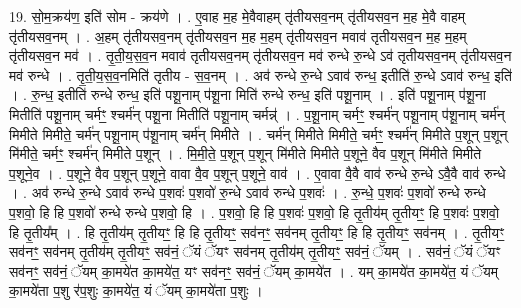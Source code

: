 \documentclass[17pt]{extarticle}
\begin{document}
19. सो॒म॒क्रय॑ण॒ इति॑ सोम - क्रय॑णे । . ए॒वाह म॒ह मे॒वैवाहम् तृ॑तीयसव॒नम् तृ॑तीयसव॒न म॒ह मे॒वै वाहम् तृ॑तीयसव॒नम् । . अ॒हम् तृ॑तीयसव॒नम् तृ॑तीयसव॒न म॒ह म॒हम् तृ॑तीयसव॒न मवाव॑ तृतीयसव॒न म॒ह म॒हम् तृ॑तीयसव॒न मव॑ । . तृ॒ती॒य॒स॒व॒न मवाव॑ तृतीयसव॒नम् तृ॑तीयसव॒न मव॑ रुन्धे रु॒न्धे ऽव॑ तृतीयसव॒नम् तृ॑तीयसव॒न मव॑ रुन्धे । . तृ॒ती॒य॒स॒व॒नमिति॑ तृतीय - स॒व॒नम् । . अव॑ रुन्धे रु॒न्धे ऽवाव॑ रुन्ध॒ इतीति॑ रु॒न्धे ऽवाव॑ रुन्ध॒ इति॑ । . रु॒न्ध॒ इतीति॑ रुन्धे रुन्ध॒ इति॑ पशू॒नाम् प॑शू॒ना मिति॑ रुन्धे रुन्ध॒ इति॑ पशू॒नाम् । . इति॑ पशू॒नाम् प॑शू॒ना मितीति॑ पशू॒नाम् चर्मꣳ॒॒ श्चर्म॑न् पशू॒ना मितीति॑ पशू॒नाम् चर्मन्न्॑ । . प॒शू॒नाम् चर्मꣳ॒॒ श्चर्म॑न् पशू॒नाम् प॑शू॒नाम् चर्म॑न् मिमीते मिमीते॒ चर्म॑न् पशू॒नाम् प॑शू॒नाम् चर्म॑न् मिमीते । . चर्म॑न् मिमीते मिमीते॒ चर्मꣳ॒॒ श्चर्म॑न् मिमीते प॒शून् प॒शून् मि॑मीते॒ चर्मꣳ॒॒ श्चर्म॑न् मिमीते प॒शून् । . मि॒मी॒ते॒ प॒शून् प॒शून् मि॑मीते मिमीते प॒शूने॒ वैव प॒शून् मि॑मीते मिमीते प॒शूने॒व । . प॒शूने॒ वैव प॒शून् प॒शूने॒ वावा वै॒व प॒शून् प॒शूने॒ वाव॑ । . ए॒वावा वै॒वै वाव॑ रुन्धे रु॒न्धे ऽवै॒वै वाव॑ रुन्धे । . अव॑ रुन्धे रु॒न्धे ऽवाव॑ रुन्धे प॒शवः॑ प॒शवो॑ रु॒न्धे ऽवाव॑ रुन्धे प॒शवः॑ । . रु॒न्धे॒ प॒शवः॑ प॒शवो॑ रुन्धे रुन्धे प॒शवो॒ हि हि प॒शवो॑ रुन्धे रुन्धे प॒शवो॒ हि । . प॒शवो॒ हि हि प॒शवः॑ प॒शवो॒ हि तृ॒तीय॑म् तृ॒तीयꣳ॒॒ हि प॒शवः॑ प॒शवो॒ हि तृ॒तीय᳚म् । . हि तृ॒तीय॑म् तृ॒तीयꣳ॒॒ हि हि तृ॒तीयꣳ॒॒ सव॑नꣳ॒॒ सव॑नम् तृ॒तीयꣳ॒॒ हि हि तृ॒तीयꣳ॒॒ सव॑नम् । . तृ॒तीयꣳ॒॒ सव॑नꣳ॒॒ सव॑नम् तृ॒तीय॑म् तृ॒तीयꣳ॒॒ सव॑नं॒ ॅयं ॅयꣳ सव॑नम् तृ॒तीय॑म् तृ॒तीयꣳ॒॒ सव॑नं॒ ॅयम् । . सव॑नं॒ ॅयं ॅयꣳ सव॑नꣳ॒॒ सव॑नं॒ ॅयम् का॒मये॑त का॒मये॑त॒ यꣳ सव॑नꣳ॒॒ सव॑नं॒ ॅयम् का॒मये॑त । . यम् का॒मये॑त का॒मये॑त॒ यं ॅयम् का॒मये॑ता प॒शु र॑प॒शुः का॒मये॑त॒ यं ॅयम् का॒मये॑ता प॒शुः । \newline
\end{document}
